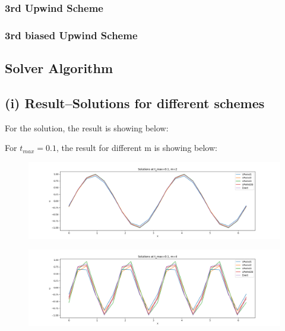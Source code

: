 \documentclass[12pt]{article}
\begin{document}
\subsubsection{3rd Upwind Scheme}

\subsubsection{3rd biased Upwind Scheme}


\subsection{Solver Algorithm}

\subsection{(i) Result--Solutions for different schemes}

For the solution, the result is showing below:

For $t_{max}=0.1$, the result for different m is showing below:

\begin{figure}[H]
    \centering
    \includegraphics[width=1\textwidth]{figures/t0.1m2.png}
    \label{IGs.jpg}
\end{figure}

\begin{figure}[H]
    \centering
    \includegraphics[width=1\textwidth]{figures/t0.1m4.png}
    \label{IGs.jpg}
\end{figure}
\end{document}
